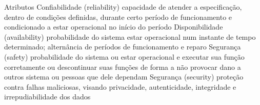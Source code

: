 Atributos 
Confiabilidade (reliability) 
capacidade de atender a especificação, dentro de condições definidas, 
durante certo período de funcionamento e condicionado a estar 
operacional no início do período 
Disponibilidade (availability) 
probabilidade do sistema estar operacional num instante de tempo 
determinado; alternância de períodos de funcionamento e reparo 
Segurança (safety) 
probabilidade do sistema ou estar operacional e executar sua função 
corretamente ou descontinuar suas funções de forma a não provocar 
dano a outros sistema ou pessoas que dele dependam 
Segurança (security) 
proteção contra falhas maliciosas, visando privacidade, autenticidade, 
integridade e irrepudiabilidade dos dados



